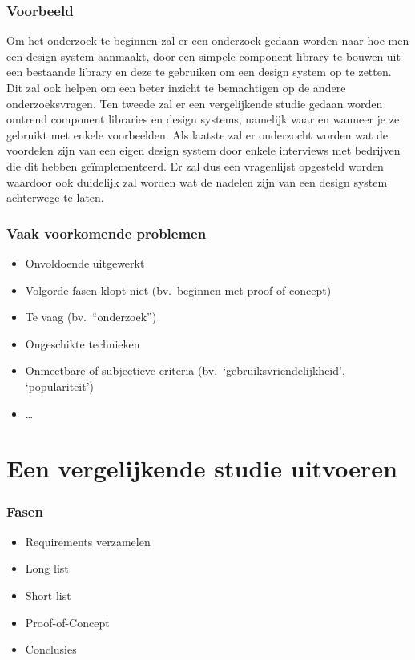 \documentclass[aspectratio=169]{beamer}
\begin{document}
\begin{frame}
  \frametitle{Voorbeeld}

  \small

  Om het onderzoek te beginnen zal er een onderzoek gedaan worden naar hoe men een design system aanmaakt, door een simpele component library te bouwen uit een bestaande library en deze te gebruiken om een design system op te zetten. Dit zal ook helpen om een beter inzicht te bemachtigen op de andere onderzoeksvragen. Ten tweede zal er een vergelijkende studie gedaan worden omtrend component libraries en design systems, namelijk waar en wanneer je ze gebruikt met enkele voorbeelden. Als laatste zal er onderzocht worden wat de voordelen zijn van een eigen design system door enkele interviews met bedrijven die dit hebben geïmplementeerd. Er zal dus een vragenlijst opgesteld worden waardoor ook duidelijk zal worden wat de nadelen zijn van een design system achterwege te laten.

\end{frame}

\begin{frame}
  \frametitle{Vaak voorkomende problemen}

  \begin{itemize}
    \item Onvoldoende uitgewerkt
    \item Volgorde fasen klopt niet (bv.\ beginnen met proof-of-concept)
    \item Te vaag (bv.\ ``onderzoek'')
    \item Ongeschikte technieken
    \item Onmeetbare of subjectieve criteria (bv.\ `gebruiksvriendelijkheid', `populariteit')
    \item \ldots
  \end{itemize}

\end{frame}

\section{Een vergelijkende studie uitvoeren}

\begin{frame}
  \frametitle{Fasen}


  \begin{itemize}
    \item Requirements verzamelen
    \item Long list
    \item Short list
    \item Proof-of-Concept
    \item Conclusies
  \end{itemize}

\end{frame}
\end{document}
